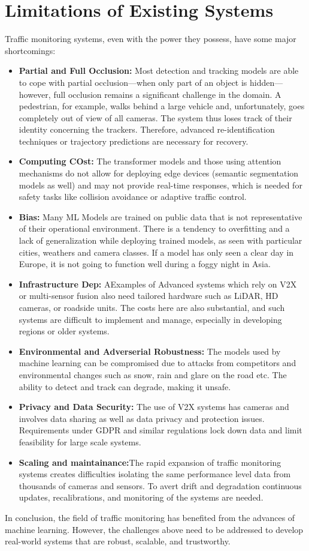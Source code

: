 \documentclass[12pt,a4paper]{report}
\theoremstyle{definition}
\theoremstyle{remark}
\begin{document}
\section{Limitations of Existing Systems}
Traffic monitoring systems, even with the power they possess, have some major shortcomings:
\begin{itemize}
    \item \textbf{Partial and Full Occlusion:} Most detection and tracking models are able to cope with partial occlusion—when only part of an object is hidden—however, full occlusion remains a significant challenge in the domain. A pedestrian, for example, walks behind a large vehicle and, unfortunately, goes completely out of view of all cameras. The system thus loses track of their identity concerning the trackers. Therefore, advanced re-identification techniques or trajectory predictions are necessary for recovery.
    \item \textbf{Computing COst:} The transformer models and those using attention mechanisms do not allow for deploying edge devices (semantic segmentation models as well) and may not provide real-time responses, which is needed for safety tasks like collision avoidance or adaptive traffic control.
    \item \textbf{Bias:} Many ML Models are trained on public data that is not representative of their operational environment. There is a tendency to overfitting and a lack of generalization while deploying trained models, as seen with particular cities, weathers and camera classes. If a model has only seen a clear day in Europe, it is not going to function well during a foggy night in Asia.
    \item \textbf{Infrastructure Dep:} AExamples of Advanced systems which rely on V2X or multi-sensor fusion also need tailored hardware such as LiDAR, HD cameras, or roadside units. The costs here are also substantial, and such systems are difficult to implement and manage, especially in developing regions or older systems.
    \item \textbf{Environmental and Adverserial Robustness:} The models used by machine learning can be compromised due to attacks from competitors and environmental changes such as snow, rain and glare on the road etc. The ability to detect and track can degrade, making it unsafe.
    \item \textbf{Privacy and Data Security:} The use of V2X systems has cameras and involves data sharing as well as data privacy and protection issues. Requirements under GDPR and similar regulations lock down data and limit feasibility for large scale systems.
    \item \textbf{Scaling and maintainance:}The rapid expansion of traffic monitoring systems creates difficulties isolating the same performance level data from thousands of cameras and sensors. To avert drift and degradation continuous updates, recalibrations, and monitoring of the systems are needed.
\end{itemize}
In conclusion, the field of traffic monitoring has benefited from the advances of machine learning. However, the challenges above need to be addressed to develop real-world systems that are robust, scalable, and trustworthy.
\end{document}
